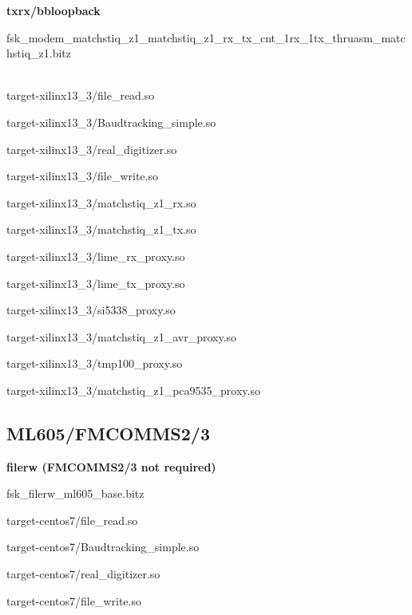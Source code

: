 \begin{appendices}
	\noindent\textbf{txrx/bbloopback}
	\begin{itemize}
	\item fsk\_modem\_matchstiq\_z1\_matchstiq\_z1\_rx\_tx\_cnt\_1rx\_1tx\_thruasm\_matchstiq\_z1.bitz \\ \\
	\begin{minipage}[t]{.5\textwidth}
	\item target-xilinx13\_3/file\_read.so
	\item target-xilinx13\_3/Baudtracking\_simple.so
	\item target-xilinx13\_3/real\_digitizer.so
	\item target-xilinx13\_3/file\_write.so
	\item target-xilinx13\_3/matchstiq\_z1\_rx.so
	\item target-xilinx13\_3/matchstiq\_z1\_tx.so
	\end{minipage}
	\begin{minipage}[t]{.5\textwidth}
	\item target-xilinx13\_3/lime\_rx\_proxy.so
	\item target-xilinx13\_3/lime\_tx\_proxy.so
	\item target-xilinx13\_3/si5338\_proxy.so
	\item target-xilinx13\_3/matchstiq\_z1\_avr\_proxy.so
	\item target-xilinx13\_3/tmp100\_proxy.so
	\item target-xilinx13\_3/matchstiq\_z1\_pca9535\_proxy.so
	\end{minipage}
	\end{itemize}
\pagebreak



\subsection{ML605/FMCOMMS2/3}
	\noindent\textbf{filerw (FMCOMMS2/3 not required)}
	\begin{itemize}
	\begin{minipage}[t]{.5\textwidth}
	\item fsk\_filerw\_ml605\_base.bitz
	\item target-centos7/file\_read.so
	\item target-centos7/Baudtracking\_simple.so
	\end{minipage}
	\begin{minipage}[t]{.5\textwidth}
	\item target-centos7/real\_digitizer.so
	\item target-centos7/file\_write.so
	\end{minipage}
	\end{itemize}


\end{appendices}
